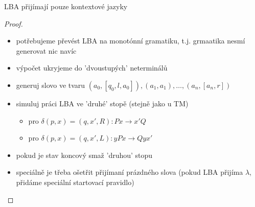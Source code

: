 \documentclass[../main.tex]{subfiles}
\begin{document}
\begin{theorem}
    LBA přijímají pouze kontextové jazyky
    \begin{proof}
        \begin{itemize}
            \item potřebujeme převést LBA na monotónní gramatiku, t.j. grmaatika nesmí generovat nic navíc
            \item výpočet ukryjeme do 'dvoustupých' neterminálů
            \item generuj slovo ve tvaru $(a_0,[q_0,l,a_0]),(a_1,a_1),\dots,(a_n,[a_n,r])$
            \item simuluj práci LBA ve 'druhé' stopě (stejně jako u TM)
            \begin{itemize}
                \item pro $\delta(p,x) = (q,x',R): Px \rightarrow x'Q$
                \item pro $\delta(p,x) = (q,x',L): yPx \rightarrow Qyx'$
            \end{itemize}
            \item pokud je stav koncový smaž 'druhou' stopu
            \item speciálně je třeba ošetřit přijímaní prázdného slova (pokud LBA přijíma $\lambda$, přidáme speciální startovací pravidlo)
        \end{itemize}
    \end{proof}
\end{theorem}
\end{document}
